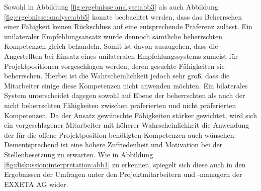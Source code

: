 Sowohl in Abbildung \ref{fig:ergebnisse:analyse:abb3} als auch Abbildung \ref{fig:ergebnisse:analyse:abb5} konnte beobachtet werden, dass das Beherrschen einer Fähigkeit keinen Rückschluss auf eine entsprechende Präferenz zulässt. Ein unilateraler Empfehlungsansatz würde dennoch sämtliche beherrschten Kompetenzen gleich behandeln. Somit ist davon auszugehen, dass die Angestellten bei Einsatz eines unilateralen Empfehlungssystems zumeist für Projektpositionen vorgeschlagen werden, deren gesuchte Fähigkeiten sie beherrschen. Hierbei ist die Wahrscheinlichkeit jedoch sehr groß, dass die Mitarbeiter einige diese Kompetenzen nicht anwenden möchten. Ein bilaterales System unterscheidet dagegen sowohl auf Ebene der beherrschten als auch der nicht beherrschten Fähigkeiten zwischen präferierten und nicht präferierten Kompetenzen. Da der Ansatz gewünschte Fähigkeiten stärker gewichtet, wird sich ein vorgeschlagener Mitarbeiter mit höherer Wahrscheinlichkeit die Anwendung der für die offene Projektposition benötigten Kompetenzen auch wünschen. Dementsprechend ist eine höhere Zufriedenheit und Motivation bei der Stellenbesetzung zu erwarten. Wie in Abbildung \ref{fig:diskussion:interpretation:abb1} zu erkennen, spiegelt sich diese auch in den Ergebnissen der Umfragen unter den Projektmitarbeitern und -managern der EXXETA AG wider.

